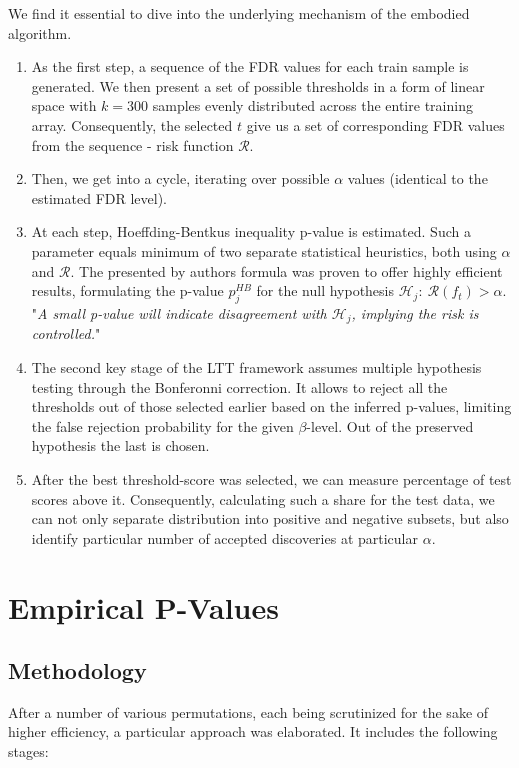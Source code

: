 \documentclass{article}
\begin{document}
We find it essential to dive into the underlying mechanism of the embodied algorithm.
\begin{enumerate}%
    \item As the first step, a sequence of the FDR values for each train sample is generated. We then present a set of possible thresholds in a form of linear space with $k=300$ samples evenly distributed across the entire training array. Consequently, the selected $t$ give us a set of corresponding FDR values from the sequence - risk function $\mathcal{R}$.
    \item Then, we get into a cycle, iterating over possible $\alpha$ values (identical to the estimated FDR level). 
    \item At each step, Hoeffding-Bentkus inequality p-value is estimated. Such a parameter equals minimum of two separate statistical heuristics, both using $\alpha$ and $\mathcal{R}$. The presented by authors formula was proven to offer highly efficient results, formulating the p-value $p_j^{HB}$ for the null hypothesis $\mathcal{H}_j: \ \mathcal{R}(f_t) > \alpha$. "\textit{A small p-value will indicate disagreement with $\mathcal{H}_j$, implying the risk is controlled.}" \cite{ltt}
    \item The second key stage of the LTT framework assumes multiple hypothesis testing through the Bonferonni correction. It allows to reject all the thresholds out of those selected earlier based on the inferred p-values, limiting the false rejection probability for the given $\beta$-level. Out of the preserved hypothesis the last is chosen.
    \item After the best threshold-score was selected, we can measure percentage of test scores above it. Consequently, calculating such a share for the test data, we can not only separate distribution into positive and negative subsets, but also identify particular number of accepted discoveries at particular $\alpha$.
\end{enumerate}

\section{Empirical P-Values}

\subsection{Methodology}
After a number of various permutations, each being scrutinized for the sake of higher efficiency, a particular approach was elaborated. It includes the following stages:
\end{document}
